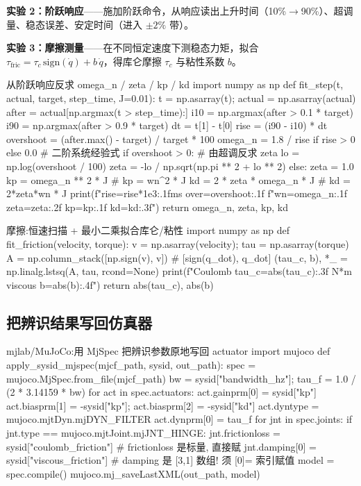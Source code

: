 \textbf{实验 2：阶跃响应}——施加阶跃命令，从响应读出上升时间（10\%$\to$90\%）、超调量、稳态误差、安定时间（进入 $\pm2\%$ 带）。

\textbf{实验 3：摩擦测量}——在不同恒定速度下测稳态力矩，拟合 $\tau_{\text{fric}}=\tau_c\,\mathrm{sign}(\dot q)+b\,\dot q$，得库仑摩擦 $\tau_c$ 与粘性系数 $b$。

\begin{codebox}[Python]{从阶跃响应反求 omega\_n / zeta / kp / kd}
import numpy as np
def fit_step(t, actual, target, step_time, J=0.01):
    t = np.asarray(t); actual = np.asarray(actual)
    after = actual[np.argmax(t > step_time):]
    i10 = np.argmax(after > 0.1 * target)
    i90 = np.argmax(after > 0.9 * target)
    dt = t[1] - t[0]
    rise = (i90 - i10) * dt
    overshoot = (after.max() - target) / target * 100
    omega_n = 1.8 / rise if rise > 0 else 0.0          # 二阶系统经验式
    if overshoot > 0:                                   # 由超调反求 zeta
        lo = np.log(overshoot / 100)
        zeta = -lo / np.sqrt(np.pi ** 2 + lo ** 2)
    else:
        zeta = 1.0
    kp = omega_n ** 2 * J                               # kp = wn^2 * J
    kd = 2 * zeta * omega_n * J                         # kd = 2*zeta*wn * J
    print(f"rise={rise*1e3:.1f}ms over={overshoot:.1f}%
          f"wn={omega_n:.1f} zeta={zeta:.2f} kp={kp:.1f} kd={kd:.3f}")
    return omega_n, zeta, kp, kd
\end{codebox}

\begin{codebox}[Python]{摩擦:恒速扫描 + 最小二乘拟合库仑/粘性}
import numpy as np
def fit_friction(velocity, torque):
    v = np.asarray(velocity); tau = np.asarray(torque)
    A = np.column_stack([np.sign(v), v])               # [sign(q_dot), q_dot]
    (tau_c, b), *_ = np.linalg.lstsq(A, tau, rcond=None)
    print(f"Coulomb tau_c={abs(tau_c):.3f} N*m  viscous b={abs(b):.4f}")
    return abs(tau_c), abs(b)
\end{codebox}

\subsection{把辨识结果写回仿真器}
\label{sec:rlmc-act-sysid-apply}

\begin{codebox}[Python]{mjlab/MuJoCo:用 MjSpec 把辨识参数原地写回 actuator}
import mujoco
def apply_sysid_mjspec(mjcf_path, sysid, out_path):
    spec = mujoco.MjSpec.from_file(mjcf_path)
    bw = sysid["bandwidth_hz"]; tau_f = 1.0 / (2 * 3.14159 * bw)
    for act in spec.actuators:
        act.gainprm[0] = sysid["kp"]
        act.biasprm[1] = -sysid["kp"]; act.biasprm[2] = -sysid["kd"]
        act.dyntype = mujoco.mjtDyn.mjDYN_FILTER
        act.dynprm[0] = tau_f
    for jnt in spec.joints:
        if jnt.type == mujoco.mjtJoint.mjJNT_HINGE:
            jnt.frictionloss = sysid["coulomb_friction"]   # frictionloss 是标量, 直接赋
            jnt.damping[0]   = sysid["viscous_friction"]   # damping 是 [3,1] 数组! 须 [0]= 索引赋值
    model = spec.compile()
    mujoco.mj_saveLastXML(out_path, model)
\end{codebox}

